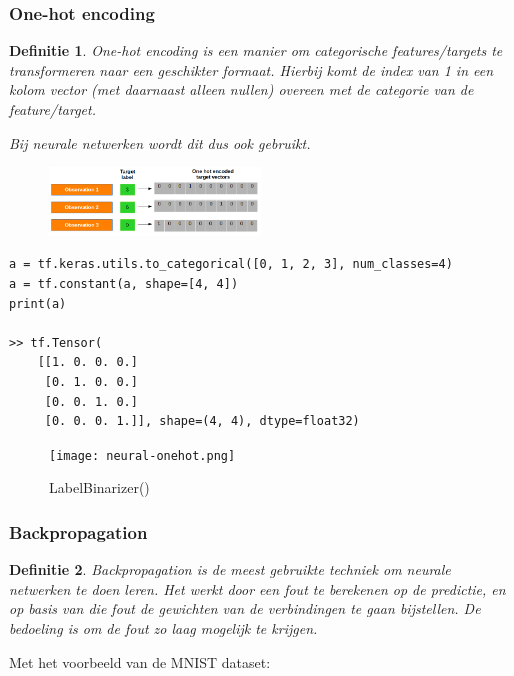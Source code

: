 \documentclass{article}
\newtheorem{theorem}{Definitie}[section]
\begin{document}
\subsubsection{One-hot encoding}

\begin{theorem}
    One-hot encoding is een manier om categorische features/targets te transformeren naar een
    geschikter formaat. Hierbij komt de index van 1 in een kolom vector (met daarnaast alleen
    nullen) overeen met de categorie van de feature/target.

    Bij neurale netwerken wordt dit dus ook gebruikt.
\end{theorem}

\begin{figure}[H]
    \centering
    \includegraphics[width=0.5\textwidth]{one-hot.png}
\end{figure}

\begin{verbatim}
a = tf.keras.utils.to_categorical([0, 1, 2, 3], num_classes=4)
a = tf.constant(a, shape=[4, 4])
print(a)

>> tf.Tensor(
    [[1. 0. 0. 0.]
     [0. 1. 0. 0.]
     [0. 0. 1. 0.]
     [0. 0. 0. 1.]], shape=(4, 4), dtype=float32)
\end{verbatim}

\begin{figure}[H]
    \centering
    \texttt{[image: neural-onehot.png]}
    \caption{LabelBinarizer()}
\end{figure}


\subsubsection{Backpropagation}

\begin{theorem}
    Backpropagation is de meest gebruikte techniek om neurale netwerken te doen leren. 
    Het werkt door een fout te berekenen op de predictie, en op basis van die fout de gewichten
    van de verbindingen te gaan bijstellen. De bedoeling is om de fout zo laag mogelijk te krijgen.
\end{theorem}

Met het voorbeeld van de MNIST dataset: 
\end{document}
